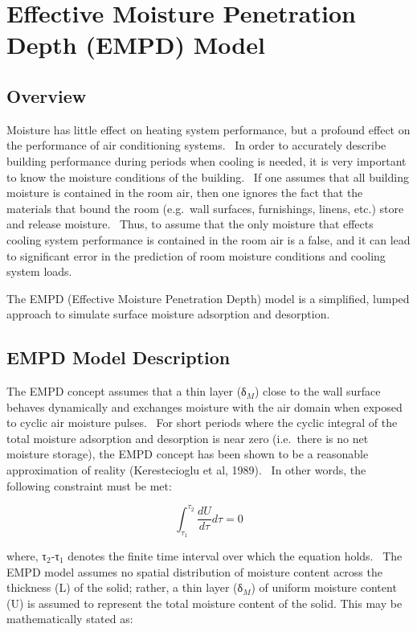 \section{Effective Moisture Penetration Depth (EMPD) Model}\label{effective-moisture-penetration-depth-empd-model}

\subsection{Overview}\label{overview-014}

Moisture has little effect on heating system performance, but a profound effect on the performance of air conditioning systems.~ In order to accurately describe building performance during periods when cooling is needed, it is very important to know the moisture conditions of the building.~ If one assumes that all building moisture is contained in the room air, then one ignores the fact that the materials that bound the room (e.g.~wall surfaces, furnishings, linens, etc.) store and release moisture.~ Thus, to assume that the only moisture that effects cooling system performance is contained in the room air is a false, and it can lead to significant error in the prediction of room moisture conditions and cooling system loads.

The EMPD (Effective Moisture Penetration Depth) model is a simplified, lumped approach to simulate surface moisture adsorption and desorption.

\subsection{EMPD Model Description}\label{empd-model-description}

The EMPD concept assumes that a thin layer (δ\(_{M}\)) close to the wall surface behaves dynamically and exchanges moisture with the air domain when exposed to cyclic air moisture pulses.~ For short periods where the cyclic integral of the total moisture adsorption and desorption is near zero (i.e.~there is no net moisture storage), the EMPD concept has been shown to be a reasonable approximation of reality (Kerestecioglu et al, 1989).~ In other words, the following constraint must be met:

\begin{equation}
\int_{{\tau_1}}^{{\tau_2}} {\frac{{dU}}{{d\tau }}} d\tau  = 0
\end{equation}

where, τ\(_{2}\)-τ\(_{1}\) denotes the finite time interval over which the equation holds.~ The EMPD model assumes no spatial distribution of moisture content across the thickness (L) of the solid; rather, a thin layer (δ\(_{M}\)) of uniform moisture content (U) is assumed to represent the total moisture content of the solid. This may be mathematically stated as:

